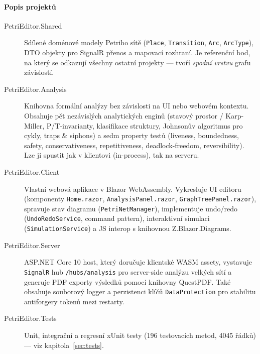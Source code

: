 \documentclass[12pt,a4paper]{article}
\begin{document}
\paragraph{Popis projektů}
\begin{description}
    \item[PetriEditor.Shared] Sdílené doménové modely Petriho sítě
          (\texttt{Place}, \texttt{Transition}, \texttt{Arc},
          \texttt{ArcType}), DTO objekty pro SignalR přenos a mapovací
          rozhraní. Je referenční bod, na který se odkazují všechny
          ostatní projekty — tvoří \emph{spodní vrstvu} grafu závislostí.

    \item[PetriEditor.Analysis] Knihovna formální analýzy bez závislosti
          na UI nebo webovém kontextu. Obsahuje pět nezávislých analytických
          enginů (stavový prostor / Karp-Miller, P/T-invarianty, klasifikace
          struktury, Johnsonův algoritmus pro cykly, traps \& siphons)
          a sedm property testů (liveness, boundedness, safety,
          conservativeness, repetitiveness, deadlock-freedom, reversibility).
          Lze ji spustit jak v klientovi (in-process), tak na serveru.

    \item[PetriEditor.Client] Vlastní webová aplikace v Blazor WebAssembly.
          Vykresluje UI editoru (komponenty \texttt{Home.razor},
          \texttt{AnalysisPanel.razor}, \texttt{GraphTreePanel.razor}),
          spravuje stav diagramu (\texttt{PetriNetManager}), implementuje
          undo/redo (\texttt{UndoRedoService}, command pattern),
          interaktivní simulaci (\texttt{SimulationService}) a JS interop
          s knihovnou Z.Blazor.Diagrams.

    \item[PetriEditor.Server] ASP.NET Core 10 host, který doručuje
          klientské WASM assety, vystavuje \texttt{SignalR} hub
          \texttt{/hubs/analysis} pro server-side analýzu velkých sítí
          a generuje PDF exporty výsledků pomocí knihovny QuestPDF.
          Také obsahuje souborový logger a perzistenci klíčů
          \texttt{DataProtection} pro stabilitu antiforgery tokenů
          mezi restarty.

    \item[PetriEditor.Tests] Unit, integrační a regresní xUnit testy
          (196 testovacích metod, 4045 řádků) — viz kapitola~\ref{sec:tests}.
\end{description}
\end{document}

